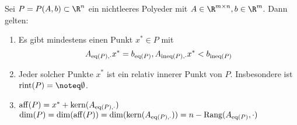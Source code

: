 \begin{satz}
Sei $P = P(A,b) \subset  \R^n$ ein nichtleeres Polyeder mit $A\in \R^{m \times n}, b\in \R^m$. Dann gelten:
\begin{enumerate}[label = (\alph*)]
	\item Es gibt mindestens einen Punkt $x^* \in P$ mit 
		\begin{equation*}
			A_{\operatorname{eq}(P),\cdot}x^* = b_{\operatorname{eq}(P)}, A_{\text{ineq}(P),\cdot}x^* < b_{\text{ineq}(P)}
		\end{equation*}
	\item Jeder solcher Punkte $x^*$ ist ein relativ innerer Punkt von $P$. Insbesondere ist $\rint(P)=\noteq \emptyset$. 
	\item $\operatorname{aff}(P) = x^* + \text{kern}(A_{\operatorname{eq}(P),\cdot})$ \\
		$\dim(P) = \dim(\operatorname{aff}(P)) = \dim (\text{kern}(A_{\operatorname{eq}(P),\cdot}))=n - \text{Rang}(A_{\operatorname{eq}(P)},\cdot)$
\end{enumerate}
\end{satz}
